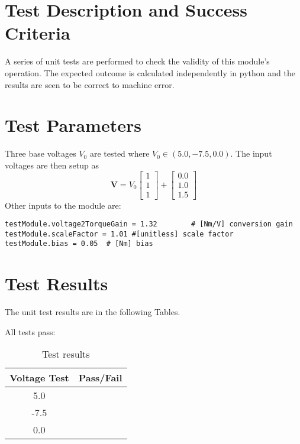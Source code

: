 \section{Test Description and Success Criteria}
A series of unit tests are performed to check the validity of this module's operation.  The expected outcome is calculated independently in python and the results are seen to be correct to machine error.

\section{Test Parameters}
Three base voltages $V_{0}$  are tested where $V_{0} \in (5.0, -7.5, 0.0)$.    The input voltages are then setup as 
\begin{equation}
\bm V = V_{0} \begin{bmatrix} 1 \\ 1 \\ 1 \end{bmatrix}
+ \begin{bmatrix} 0.0 \\ 1.0 \\ 1.5 \end{bmatrix}
\end{equation} 
Other inputs to the module are:
\begin{verbatim}
testModule.voltage2TorqueGain = 1.32        # [Nm/V] conversion gain 
testModule.scaleFactor = 1.01 #[unitless] scale factor
testModule.bias = 0.05	# [Nm] bias
\end{verbatim}

\section{Test Results}
The unit test results are in the following Tables.  





All tests pass:
\begin{table}[H]
	\caption{Test results}
	\label{tab:results}
	\centering \fontsize{10}{10}\selectfont
	\begin{tabular}{c | c  } %
		\hline
		\textbf{Voltage Test} 						  		&\textbf{Pass/Fail} \\ \hline
		5.0	   			&  \\ \hline
		-7.5	   			&  \\ \hline
		0.0	   			&  \\ \hline
	\end{tabular}
\end{table}
